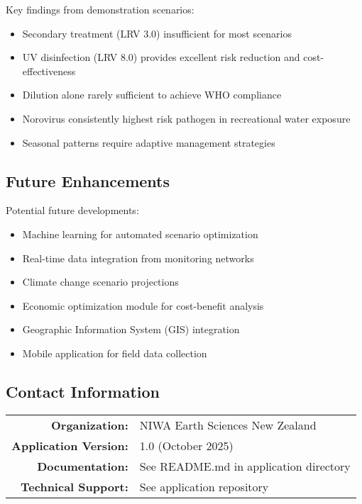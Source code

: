 \documentclass[11pt,a4paper]{article}
\begin{document}
Key findings from demonstration scenarios:
\begin{itemize}[leftmargin=*]
    \item Secondary treatment (LRV 3.0) insufficient for most scenarios
    \item UV disinfection (LRV 8.0) provides excellent risk reduction and cost-effectiveness
    \item Dilution alone rarely sufficient to achieve WHO compliance
    \item Norovirus consistently highest risk pathogen in recreational water exposure
    \item Seasonal patterns require adaptive management strategies
\end{itemize}

\subsection{Future Enhancements}

Potential future developments:
\begin{itemize}[leftmargin=*]
    \item Machine learning for automated scenario optimization
    \item Real-time data integration from monitoring networks
    \item Climate change scenario projections
    \item Economic optimization module for cost-benefit analysis
    \item Geographic Information System (GIS) integration
    \item Mobile application for field data collection
\end{itemize}

\subsection{Contact Information}

\begin{table}[H]
\centering
\begin{tabular}{rl}
\toprule
\textbf{Organization:} & NIWA Earth Sciences New Zealand \\
\textbf{Application Version:} & 1.0 (October 2025) \\
\textbf{Documentation:} & See README.md in application directory \\
\textbf{Technical Support:} & See application repository \\
\bottomrule
\end{tabular}
\end{table}
\end{document}
